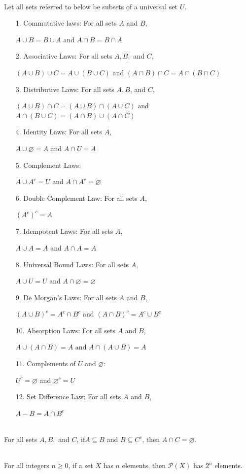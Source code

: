 \documentclass[12pt]{article}
\begin{document}
\begin{theorem}[6.2.2(Epp)]
\hfill\\
\normalfont Let all sets referred to below be subsets of a universal set $U$.
\begin{enumerate}
\item[1.] Commutative laws: For all sets $A$ and $B$,
\item[] $A\cup B=B\cup A$ and $A\cap B = B\cap A$
\item[2.] Associative Laws: For all sets $A,B,$ and $C$,
\item[] $(A\cup B)\cup C = A\cup(B\cup C)$ and $(A\cap B)\cap C=A\cap(B\cap C)$
\item[3.] Distributive Laws: For all sets $A, B$, and $C$,
\item[] $(A\cup B)\cap C = (A\cup B)\cap (A\cup C)$ and $A\cap (B\cup C)=(A\cap B)\cup (A\cap C)$
\item[4.] Identity Laws: For all sets $A$,
\item[] $A\cup \varnothing=A$ and $A\cap U=A$
\item[5.] Complement Laws: 
\item[] $A\cup A^{c}=U$ and $A\cap A^c=\varnothing$
\item[6.] Double Complement Law: For all sets $A$,
\item[] $(A^c)^c=A$
\item[7.] Idempotent Laws: For all sets $A$,
\item[] $A\cup A=A$ and $A\cap A=A$
\item[8.] Universal Bound Laws: For all sets $A$,
\item[] $A\cup U = U$ and $A\cap \varnothing = \varnothing$
\item[9.] De Morgan's Laws: For all sets $A$ and $B$,
\item[] $(A\cup B)^c=A^c\cap B^c$ and $(A\cap B)^c=A^c\cup B^c$
\item[10.] Absorption Laws: For all sets $A$ and $B$,
\item[] $A\cup(A\cap B)=A$ and $A\cap(A\cup B)=A$
\item[11.] Complements of $U$ and $\varnothing$:
\item[] $U^c=\varnothing$ and $\varnothing^c=U$
\item[12.] Set Difference Law: For all sets $A$ and $B$,
\item[] $A-B= A\cap B^c$
\end{enumerate}
\end{theorem}
\begin{proposition}[6.2.6(Epp)]
\hfill\\
\normalfont For all sets $A,B,$ and $C$, if$A\subseteq B$ and $B\subseteq C^c$, then $A\cap C=\varnothing$.
\end{proposition}
\begin{theorem}[6.3.1(Epp)]
\hfill\\
\normalfont For all integers $n\geq 0$, if a set $X$ has $n$ elements, then $\mathcal{P}(X)$ has $2^n$ elements.
\end{theorem}
\clearpage
\end{document}
